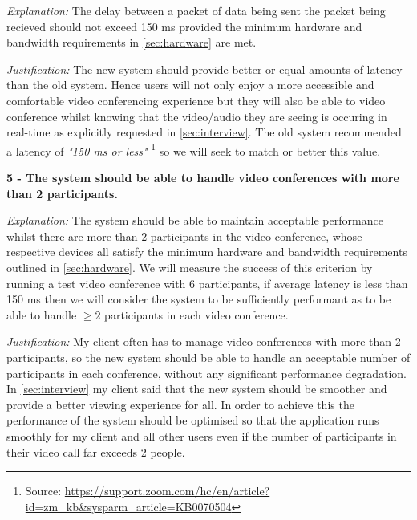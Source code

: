 \textit{Explanation:}
The delay between a packet of data being sent the packet 
being recieved should not exceed 150 ms provided the minimum
hardware and bandwidth requirements in \ref{sec:hardware} 
are met.

\vspace{0.1cm}

\textit{Justification:}
The new system should provide better or equal amounts of 
latency than the old system. Hence users will not only enjoy
a more accessible and comfortable video conferencing 
experience but they will also be able to video conference 
whilst knowing that the video/audio they are seeing is
occuring in real-time as explicitly requested in 
\ref{sec:interview}. The old system recommended a latency of
\textit{"150 ms or less"} \footnote{Source:
\url{https://support.zoom.com/hc/en/article?id=zm_kb&sysparm_article=KB0070504}} 
so we will seek to match or better this value.

\vspace{0.2cm}

\textbf{5 - The system should be able to handle video 
conferences with more than 2 participants.}

\vspace{0.1cm}

\textit{Explanation:}
The system should be able to maintain acceptable performance
whilst there are more than 2 participants in the video 
conference, whose respective devices all satisfy the minimum
hardware and bandwidth requirements outlined in 
\ref{sec:hardware}. We will measure the success of this 
criterion by running a test video conference with 6 
participants, if average latency is less than 150 ms then we
will consider the system to be sufficiently performant as to 
be able to handle $\geq 2$ participants in each video
conference.
\vspace{0.1cm}

\textit{Justification:}
My client often has to manage video conferences with more than
2 participants, so the new system should be able to handle an 
acceptable number of participants in each conference, without
any significant performance degradation. In
\ref{sec:interview} my client said that the new system should 
be smoother and provide a better viewing experience for all.
In order to achieve this the performance of the system should
be optimised so that the application runs smoothly for my 
client and all other users even if the number of participants
in their video call far exceeds 2 people.
